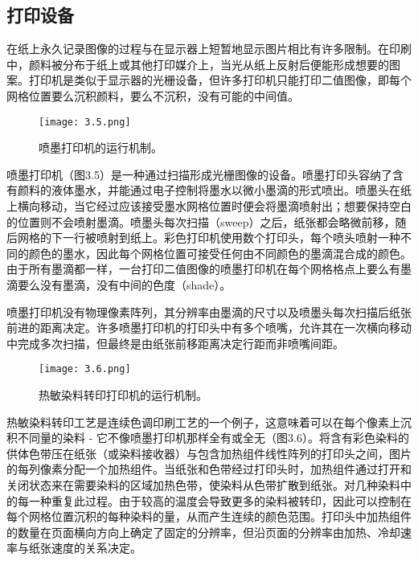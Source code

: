 \documentclass[lang=cn,12pt]{elegantbook}
\begin{document}

\subsection{打印设备}

在纸上永久记录图像的过程与在显示器上短暂地显示图片相比有许多限制。在印刷中，颜料被分布于纸上或其他打印媒介上，当光从纸上反射后便能形成想要的图案。打印机是类似于显示器的光栅设备，但许多打印机只能打印二值图像，即每个网格位置要么沉积颜料，要么不沉积，没有可能的中间值。

\begin{figure}[htb]
\centering
\texttt{[image: 3.5.png]}
\caption{喷墨打印机的运行机制。}
\end{figure}

喷墨打印机（图3.5）是一种通过扫描形成光栅图像的设备。喷墨打印头容纳了含有颜料的液体墨水，并能通过电子控制将墨水以微小墨滴的形式喷出。喷墨头在纸上横向移动，当它经过应该接受墨水网格位置时便会将墨滴喷射出；想要保持空白的位置则不会喷射墨滴。喷墨头每次扫描（sweep）之后，纸张都会略微前移，随后网格的下一行被喷射到纸上。彩色打印机使用数个打印头，每个喷头喷射一种不同的颜色的墨水，因此每个网格位置可接受任何由不同颜色的墨滴混合成的颜色。由于所有墨滴都一样，一台打印二值图像的喷墨打印机在每个网格格点上要么有墨滴要么没有墨滴，没有中间的色度（shade）。

喷墨打印机没有物理像素阵列，其分辨率由墨滴的尺寸以及喷墨头每次扫描后纸张前进的距离决定。许多喷墨打印机的打印头中有多个喷嘴，允许其在一次横向移动中完成多次扫描，但最终是由纸张前移距离决定行距而非喷嘴间距。


\begin{figure}[htb]
  \centering
  \texttt{[image: 3.6.png]}
  \caption{热敏染料转印打印机的运行机制。}
  \end{figure}

热敏染料转印工艺是连续色调印刷工艺的一个例子，这意味着可以在每个像素上沉积不同量的染料 - 它不像喷墨打印机那样全有或全无（图3.6）。将含有彩色染料的供体色带压在纸张（或染料接收器）与包含加热组件线性阵列的打印头之间，图片的每列像素分配一个加热组件。当纸张和色带经过打印头时，加热组件通过打开和关闭状态来在需要染料的区域加热色带，使染料从色带扩散到纸张。对几种染料中的每一种重复此过程。由于较高的温度会导致更多的染料被转印，因此可以控制在每个网格位置沉积的每种染料的量，从而产生连续的颜色范围。打印头中加热组件的数量在页面横向方向上确定了固定的分辨率，但沿页面的分辨率由加热、冷却速率与纸张速度的关系决定。
\end{document}
